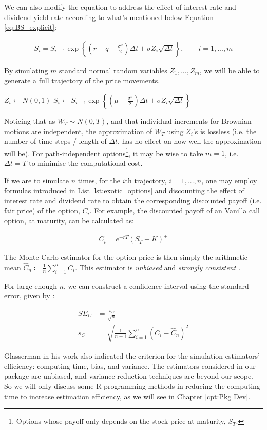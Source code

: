 We can also modify the equation to address the effect of interest rate and dividend yield rate according to what's mentioned below Equation \ref{eq:BS_explicit}:

\begin{align} \label{eq:mc_explicit_rq}
S_{i} = S_{i-1}\exp{\left\{(r-q-\frac{\sigma^2}{2})\Delta t+\sigma Z_i \sqrt{\Delta t}\right\}},\qquad i=1,...,m
\end{align}

By simulating $m$ standard normal random variables $Z_1,...,Z_m$, we will be able to generate a full trajectory of the price movements.

\begin{algorithmic}
	\State $Z_{i} \gets N(0,1)$
	\State $S_{i} \gets S_{i-1}\exp{\left\{(\mu-\frac{\sigma^2}{2})\Delta t+\sigma Z_i \sqrt{\Delta t}\right\}}$
\EndFor
\end{algorithmic}

Noticing that as $W_T\sim N(0,T)$, and that individual increments for Brownian motions are independent, the approximation of $W_T$ using $Z_i$'s is lossless (i.e. the number of time steps / length of $\Delta t$, has no effect on how well the approximation will be). For path-independent options\footnote{Options whose payoff only depends on the stock price at maturity, $S_T$.}, it may be wise to take $m=1$, i.e. $\Delta t=T$ to minimise the computational cost.

If we are to simulate $n$ times, for the $i$th trajectory, $i=1,...,n$, one may employ formulas introduced in List \ref{lst:exotic_options} and discounting the effect of interest rate and dividend rate to obtain the corresponding discounted payoff (i.e. fair price) of the option, $C_i$. For example, the discounted payoff of an Vanilla call option, at maturity, can be calculated as:

\begin{align} \label{eq:discount_vanilla_payoff}
C_i = e^{-rT}(S_T-K)^+
\end{align}

The Monte Carlo estimator for the option price is then simply the arithmetic mean $\hat{C}_n\coloneqq\frac{1}{n}\sum_{i=1}^{n}{C_i}$. This estimator is \textit{unbiased} and \textit{strongly consistent} \cite{Glasserman2003}.

For large enough $n$, we can construct a confidence interval using the standard error, given by \cite{Glasserman2003}:

\begin{align} \label{eq:mc_SE}
SE_C &= \frac{s_C}{\sqrt{n}} \\
 s_C &= \sqrt{\frac{1}{n-1}\sum_{i=1}^{n}{(C_i-\hat{C}_n)^2}}
\end{align}

Glasserman in his work \cite{Glasserman2003} also indicated the criterion for the simulation estimators' efficiency: computing time, bias, and variance. The estimators considered in our package are unbiased, and variance reduction techniques are beyond our scope. So we will only discuss some R programming methods in reducing the computing time to increase estimation efficiency, as we will see in Chapter \ref{cpt:Pkg Dev}.

\newpage